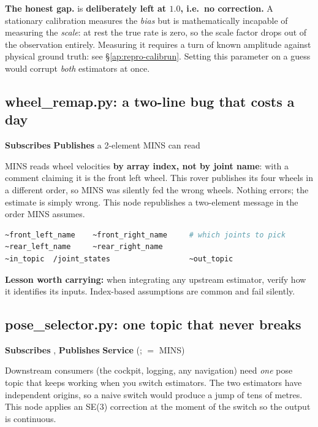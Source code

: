 \noindent \textbf{The honest gap.}  is
\textbf{deliberately left at $1.0$, i.e.\ no correction.} A stationary
calibration measures the \emph{bias} but is mathematically incapable of
measuring the \emph{scale}: at rest the true rate is zero, so the scale factor
drops out of the observation entirely. Measuring it requires a turn of known
amplitude against physical ground truth: see
\S\ref{ap:repro-calibrun}. Setting this parameter on a guess would corrupt
\emph{both} estimators at once.

\subsection{wheel\_remap.py: a two-line bug that costs a day}
\label{ap:repro-wheelremap}
\textbf{Subscribes}  \quad
\textbf{Publishes} a 2-element  MINS can read

MINS reads wheel velocities \textbf{by array index, not by joint name}:
 with a comment claiming it is the front
left wheel. This rover publishes its four wheels in a different order, so MINS
was silently fed the wrong wheels. Nothing errors; the estimate is simply
wrong. This node republishes a two-element message in the order MINS assumes.

\begin{lstlisting}[language=bash]
~front_left_name    ~front_right_name     # which joints to pick
~rear_left_name     ~rear_right_name
~in_topic  /joint_states                  ~out_topic
\end{lstlisting}

\noindent \textbf{Lesson worth carrying:} when integrating any upstream
estimator, verify how it identifies its inputs. Index-based assumptions are
common and fail silently.

\subsection{pose\_selector.py: one topic that never breaks}
\label{ap:repro-poseselector}
\textbf{Subscribes} ,  \quad
\textbf{Publishes}  \quad
\textbf{Service}  (;
 $=$ MINS)

Downstream consumers (the cockpit, logging, any navigation) need
\emph{one} pose topic that keeps working when you switch estimators. The two
estimators have independent origins, so a naive switch would produce a jump of
tens of metres. This node applies an SE(3) correction at the moment of the
switch so the output is continuous.

